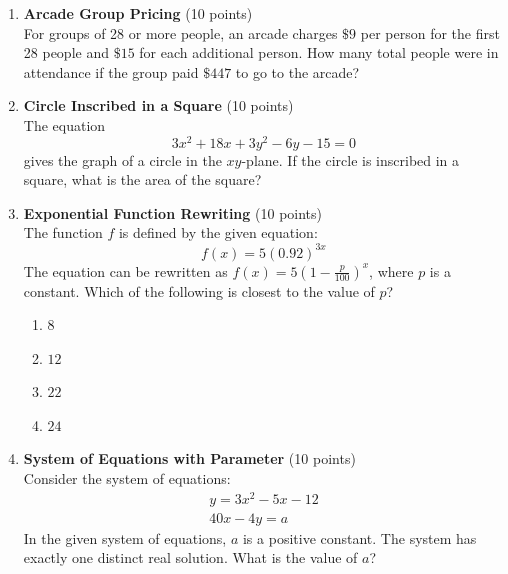 \begin{enumerate}
  \item \textbf{Arcade Group Pricing} (10 points)\\
  For groups of 28 or more people, an arcade charges $\$9$ per person for the first 28 people and $\$15$ for each additional person. How many total people were in attendance if the group paid $\$447$ to go to the arcade?
  \begin{subanswer}
  \end{subanswer}



  \item \textbf{Circle Inscribed in a Square} (10 points)\\
  The equation
  \[
    3 x^2+18 x+3 y^2-6 y-15=0
  \]
  gives the graph of a circle in the $xy$-plane. If the circle is inscribed in a square, what is the area of the square?
  \begin{subanswer}
  \end{subanswer}



  \item \textbf{Exponential Function Rewriting} (10 points)\\
  The function $f$ is defined by the given equation:
  \[
    f(x)=5(0.92)^{3 x}
  \]
  The equation can be rewritten as $f(x)=5\left(1-\frac{p}{100}\right)^x$, where $p$ is a constant. Which of the following is closest to the value of $p$?
  \begin{enumerate}[label=(\Alph*)]
    \item $8$
    \item $12$
    \item $22$
    \item $24$
  \end{enumerate}
  \begin{subanswer}
  \end{subanswer}



  \item \textbf{System of Equations with Parameter} (10 points)\\
  Consider the system of equations:
  \[
    \begin{gathered}
    y=3 x^2-5 x-12 \\
    40 x-4 y=a
    \end{gathered}
  \]
  In the given system of equations, $a$ is a positive constant. The system has exactly one distinct real solution. What is the value of $a$?
  \begin{subanswer}
  \end{subanswer}


\end{enumerate}
